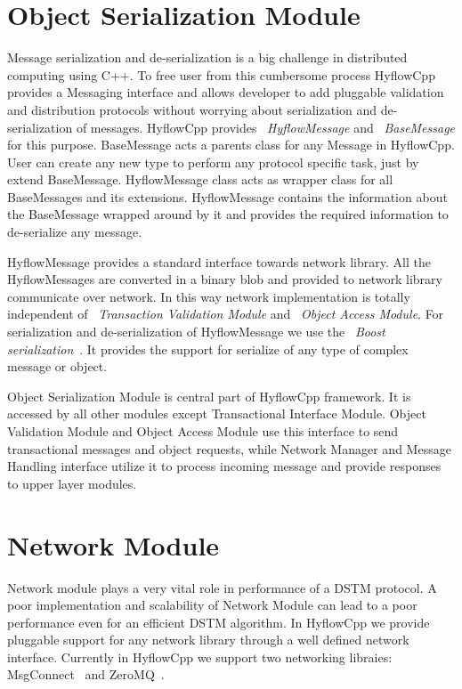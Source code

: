 \documentclass[12pt,english]{report}
\begin{document}
\section{Object Serialization Module}

Message serialization and de-serialization is a big challenge in distributed computing using C++. To free user from this cumbersome process HyflowCpp provides a Messaging interface and allows developer to add pluggable validation and distribution protocols without worrying about serialization and de-serialization of messages. HyflowCpp provides ~\emph{HyflowMessage} and ~\emph{BaseMessage} for this purpose. BaseMessage acts a parents class for any Message in HyflowCpp. User can create any new type to perform any protocol specific task, just by extend BaseMessage. HyflowMessage class acts as wrapper class for all BaseMessages and its extensions. HyflowMessage contains the information about the BaseMessage wrapped around by it and provides the required information to de-serialize any message.

HyflowMessage provides a standard interface towards network library. All the HyflowMessages are converted in a binary blob and provided to network library communicate over network. In this way network implementation is totally independent of ~\emph{Transaction Validation Module} and ~\emph{Object Access Module}. For serialization and de-serialization of HyflowMessage we use the ~\emph{Boost serialization}~\cite{karlsson2005beyond}. It provides the support for serialize of any type of complex message or object.  

Object Serialization Module is central part of HyflowCpp framework. It is accessed by all other modules except Transactional Interface Module. Object Validation Module and Object Access Module use this interface to send transactional messages and object requests, while Network Manager and Message Handling interface utilize it to process incoming message and provide responses to upper layer modules.

\section{Network Module}

Network module plays a very vital role in performance of a DSTM protocol. A poor implementation and scalability of Network Module can lead to a poor performance even for an efficient DSTM algorithm. In HyflowCpp we provide pluggable support for any network library through a well defined network interface. Currently in HyflowCpp we support two networking libraies: MsgConnect~\cite{MsgConnect:2012} and ZeroMQ~\cite{hintjens2011omq}.  
\end{document}
